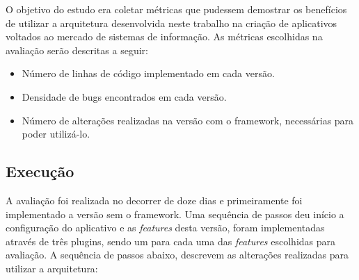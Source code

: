 O objetivo do estudo era coletar métricas que pudessem demostrar os benefícios de utilizar a arquitetura desenvolvida neste trabalho na criação de aplicativos voltados ao mercado de sistemas de informação. As métricas escolhidas na avaliação serão descritas a seguir:

\begin{itemize}
	\item Número de linhas de código implementado em cada versão.

	\item Densidade de bugs encontrados em cada versão.

	\item Número de alterações realizadas na versão com o framework, necessárias para poder utilizá-lo.
\end{itemize}


\subsection{Execução}
A avaliação foi realizada no decorrer de doze dias e primeiramente foi implementado a versão sem o framework. Uma sequência de passos deu início a configuração do aplicativo e as \textit{features} desta versão, foram implementadas através de três plugins, sendo um para cada uma das \textit{features} escolhidas para avaliação. A sequência de passos abaixo, descrevem as alterações realizadas para utilizar a arquitetura:

